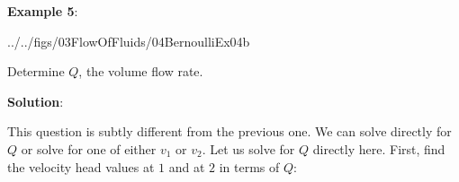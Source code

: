 \documentclass[10pt]{amsart}
\begin{document}
\begin{minipage}[t]{0.42\textwidth}
	\raggedright
	\textbf{Example 5}:\\
	\vspace*{-0.5cm}
	\begin{cfig}[0.4]{../../figs/03FlowOfFluids/04BernoulliEx04b}\end{cfig}
	Determine $Q$, the volume flow rate.
	
	\parb
	\textbf{Solution}:
	\parb
	
	This question is subtly different from the previous one. We can solve directly
	for $Q$ or solve for one of either $v_1$ or $v_2$. Let us solve for $Q$ directly here.\parb
	First, find the velocity head values at $1$ and at $2$ in terms of $Q$:
\end{minipage}
\hfill
\end{document}
